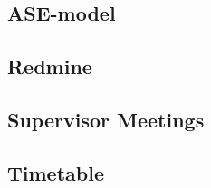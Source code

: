 \subsection{ASE-model}


\subsection{Redmine}


\subsection{Supervisor Meetings}


\subsection{Timetable}






